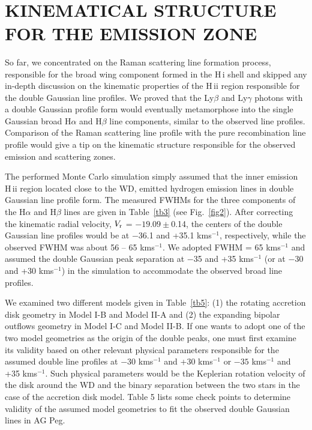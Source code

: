 \documentclass[a4paper,fleqn,usenatbib,useAMS]{mnras}
\def\ha{H{$\alpha$}}
\def\hb{H{$\beta$}}
\def\hi{H\,{\sc i}}
\def\hii{H\,{\sc ii}}
\def\kms{km\hspace{1pt}s$^{-1}$}
\begin{document}
{\begin{table}
\begin{tabular}{cccc}
\end{tabular} \\
\label{tb6}
\end{table}




\section{KINEMATICAL STRUCTURE FOR THE EMISSION ZONE}

So far, we concentrated on the Raman scattering line formation process, responsible for the broad wing component formed in the {\hi} shell and skipped any in-depth discussion on the kinematic properties of the {\hii} region responsible for the double Gaussian line profiles. We proved that the Ly$\beta$ and Ly$\gamma$ photons with a double Gaussian profile form would eventually metamorphose into the single Gaussian broad {\ha} and {\hb} line components, similar to the observed line profiles. Comparison of the Raman scattering  line profile with the pure recombination line profile would give a tip on the kinematic structure responsible for the observed emission and scattering zones.

The performed Monte Carlo simulation simply assumed that the inner emission {\hii} region located close to the WD, emitted hydrogen emission lines in double Gaussian line profile form.
The measured FWHMs for the three components of the {\ha} and {\hb} lines are given in  Table~\ref{tb3} (see Fig.~\ref{fig2}). After correcting the kinematic radial velocity, $V_{\rm r}$ = $-19.09\pm$0.14, the centers of the double Gaussian line profiles would be  at  $-$36.1 and +35.1 {\kms}, respectively, while the observed FWHM was about 56 -- 65 {\kms}. We adopted FWHM = 65 {\kms} and assumed the double Gaussian peak separation at  $-$35 and +35 {\kms} (or at $-$30 and +30 {\kms}) in the simulation to accommodate the observed broad line profiles.


We examined two different models given in Table~\ref{tb5}: (1) the rotating accretion disk geometry in Model I-B and Model II-A
and (2) the expanding bipolar outflows geometry in Model I-C and Model II-B.
If one wants to adopt one of the two model geometries as the origin of the double peaks, one must first examine its validity based on other relevant physical parameters responsible for the assumed double line profiles at  $-30$ {\kms} and +30 {\kms} or  $-35$ {\kms} and +35 {\kms}.
Such physical parameters would be the Keplerian rotation velocity of the disk around the WD and the binary separation between the two stars in the case of the accretion disk model. Table 5 lists some check points to determine validity of the assumed model geometries to fit the observed double Gaussian lines in AG Peg.

}
\end{document}

